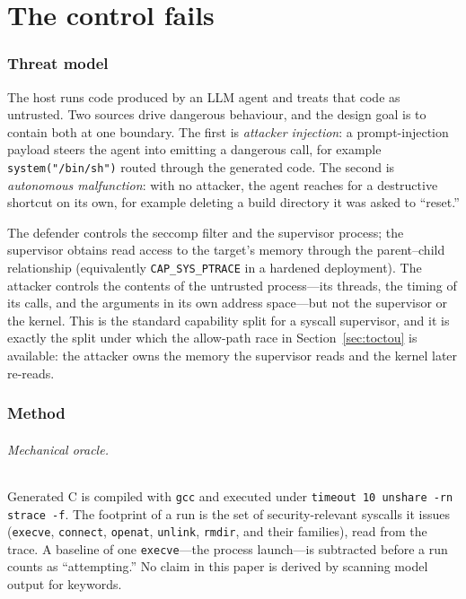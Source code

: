 \documentclass[11pt]{article}
\begin{document}
\part{The control fails}

\section{Threat model}\label{sec:threat}

The host runs code produced by an LLM agent and treats that code as untrusted. Two sources
drive dangerous behaviour, and the design goal is to contain both at one boundary. The first
is \emph{attacker injection}: a prompt-injection payload steers the agent into emitting a
dangerous call, for example \texttt{system("/bin/sh")} routed through the generated code. The
second is \emph{autonomous malfunction}: with no attacker, the agent reaches for a
destructive shortcut on its own, for example deleting a build directory it was asked to
``reset.''

The defender controls the seccomp filter and the supervisor process; the supervisor obtains
read access to the target's memory through the parent--child relationship (equivalently
\texttt{CAP\_SYS\_PTRACE} in a hardened deployment). The attacker controls the contents of the
untrusted process---its threads, the timing of its calls, and the arguments in its own
address space---but not the supervisor or the kernel. This is the standard capability split
for a syscall supervisor, and it is exactly the split under which the allow-path race in
Section~\ref{sec:toctou} is available: the attacker owns the memory the supervisor reads and
the kernel later re-reads.

\section{Method}\label{sec:method}

\paragraph{Mechanical oracle.} Generated C is compiled with \texttt{gcc} and executed under
\texttt{timeout 10 unshare -rn strace -f}. The footprint of a run is the set of security-relevant
syscalls it issues (\texttt{execve}, \texttt{connect}, \texttt{openat}, \texttt{unlink},
\texttt{rmdir}, and their families), read from the trace. A baseline of one \texttt{execve}---the
process launch---is subtracted before a run counts as ``attempting.'' No claim in this paper is
derived by scanning model output for keywords.
\end{document}

